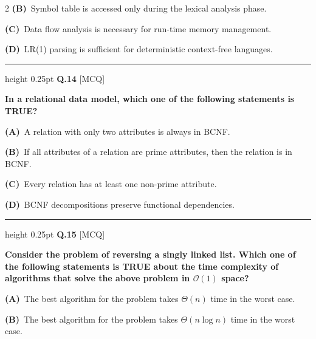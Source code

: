 \documentclass[a4paper,10pt,twoside]{article}
\begin{document}
\begin{multicols}{2}
\textbf{(B)}~Symbol table is accessed only during the lexical analysis phase.\par\vspace{2pt}\noindent
\textbf{(C)}~Data flow analysis is necessary for run-time memory management.\par\vspace{2pt}\noindent
\textbf{(D)}~LR(1) parsing is sufficient for deterministic context-free languages.
\par\vspace{6pt}\hrule height 0.25pt\vspace{6pt}
\noindent\textbf{Q.14} \hfill {\footnotesize\textsf{[MCQ]}}
\par\vspace{2pt}
{\bfseries In a relational data model, which one of the following statements is TRUE? \par}
\par\vspace{2pt}\noindent
\textbf{(A)}~A relation with only two attributes is always in BCNF.\par\vspace{2pt}\noindent
\textbf{(B)}~If all attributes of a relation are prime attributes, then the relation is in BCNF.\par\vspace{2pt}\noindent
\textbf{(C)}~Every relation has at least one non-prime attribute.\par\vspace{2pt}\noindent
\textbf{(D)}~BCNF decompositions preserve functional dependencies.
\par\vspace{6pt}\hrule height 0.25pt\vspace{6pt}
\noindent\textbf{Q.15} \hfill {\footnotesize\textsf{[MCQ]}}
\par\vspace{2pt}
{\bfseries Consider the problem of reversing a singly linked list. Which one of the following statements is TRUE about the time complexity of algorithms that solve the above problem in $\mathcal{O}(1)$ space? \par}
\par\vspace{2pt}\noindent
\textbf{(A)}~The best algorithm for the problem takes $\Theta(n)$ time in the worst case.\par\vspace{2pt}\noindent
\textbf{(B)}~The best algorithm for the problem takes $\Theta(n \log n)$ time in the worst case.\par\vspace{2pt}\noindent

\end{multicols}
\end{document}
